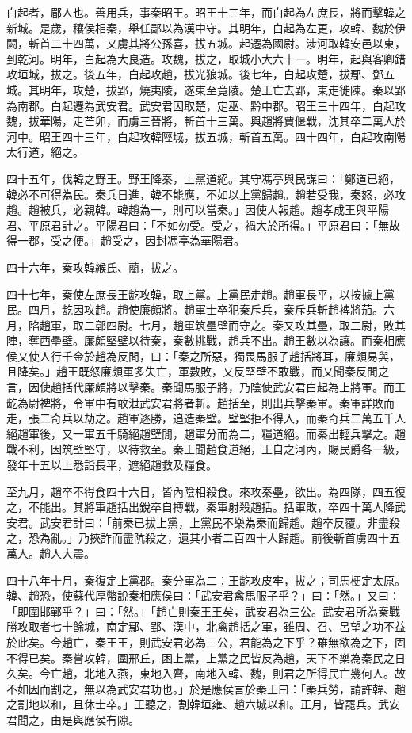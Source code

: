 
\begin{pinyinscope}
白起者，郿人也。善用兵，事秦昭王。昭王十三年，而白起為左庶長，將而擊韓之新城。是歲，穰侯相秦，舉任鄙以為漢中守。其明年，白起為左更，攻韓、魏於伊闕，斬首二十四萬，又虜其將公孫喜，拔五城。起遷為國尉。涉河取韓安邑以東，到乾河。明年，白起為大良造。攻魏，拔之，取城小大六十一。明年，起與客卿錯攻垣城，拔之。後五年，白起攻趙，拔光狼城。後七年，白起攻楚，拔鄢、鄧五城。其明年，攻楚，拔郢，燒夷陵，遂東至竟陵。楚王亡去郢，東走徙陳。秦以郢為南郡。白起遷為武安君。武安君因取楚，定巫、黔中郡。昭王三十四年，白起攻魏，拔華陽，走芒卯，而虜三晉將，斬首十三萬。與趙將賈偃戰，沈其卒二萬人於河中。昭王四十三年，白起攻韓陘城，拔五城，斬首五萬。四十四年，白起攻南陽太行道，絕之。

四十五年，伐韓之野王。野王降秦，上黨道絕。其守馮亭與民謀曰：「鄭道已絕，韓必不可得為民。秦兵日進，韓不能應，不如以上黨歸趙。趙若受我，秦怒，必攻趙。趙被兵，必親韓。韓趙為一，則可以當秦。」因使人報趙。趙孝成王與平陽君、平原君計之。平陽君曰：「不如勿受。受之，禍大於所得。」平原君曰：「無故得一郡，受之便。」趙受之，因封馮亭為華陽君。

四十六年，秦攻韓緱氏、藺，拔之。

四十七年，秦使左庶長王龁攻韓，取上黨。上黨民走趙。趙軍長平，以按據上黨民。四月，龁因攻趙。趙使廉頗將。趙軍士卒犯秦斥兵，秦斥兵斬趙裨將茄。六月，陷趙軍，取二鄣四尉。七月，趙軍筑壘壁而守之。秦又攻其壘，取二尉，敗其陣，奪西壘壁。廉頗堅壁以待秦，秦數挑戰，趙兵不出。趙王數以為讓。而秦相應侯又使人行千金於趙為反閒，曰：「秦之所惡，獨畏馬服子趙括將耳，廉頗易與，且降矣。」趙王既怒廉頗軍多失亡，軍數敗，又反堅壁不敢戰，而又聞秦反閒之言，因使趙括代廉頗將以擊秦。秦聞馬服子將，乃陰使武安君白起為上將軍。而王龁為尉裨將，令軍中有敢泄武安君將者斬。趙括至，則出兵擊秦軍。秦軍詳敗而走，張二奇兵以劫之。趙軍逐勝，追造秦壁。壁堅拒不得入，而秦奇兵二萬五千人絕趙軍後，又一軍五千騎絕趙壁閒，趙軍分而為二，糧道絕。而秦出輕兵擊之。趙戰不利，因筑壁堅守，以待救至。秦王聞趙食道絕，王自之河內，賜民爵各一級，發年十五以上悉詣長平，遮絕趙救及糧食。

至九月，趙卒不得食四十六日，皆內陰相殺食。來攻秦壘，欲出。為四隊，四五復之，不能出。其將軍趙括出銳卒自搏戰，秦軍射殺趙括。括軍敗，卒四十萬人降武安君。武安君計曰：「前秦已拔上黨，上黨民不樂為秦而歸趙。趙卒反覆。非盡殺之，恐為亂。」乃挾詐而盡阬殺之，遺其小者二百四十人歸趙。前後斬首虜四十五萬人。趙人大震。

四十八年十月，秦復定上黨郡。秦分軍為二：王龁攻皮牢，拔之；司馬梗定太原。韓、趙恐，使蘇代厚幣說秦相應侯曰：「武安君禽馬服子乎？」曰：「然。」又曰：「即圍邯鄲乎？」曰：「然。」「趙亡則秦王王矣，武安君為三公。武安君所為秦戰勝攻取者七十餘城，南定鄢、郢、漢中，北禽趙括之軍，雖周、召、呂望之功不益於此矣。今趙亡，秦王王，則武安君必為三公，君能為之下乎？雖無欲為之下，固不得已矣。秦嘗攻韓，圍邢丘，困上黨，上黨之民皆反為趙，天下不樂為秦民之日久矣。今亡趙，北地入燕，東地入齊，南地入韓、魏，則君之所得民亡幾何人。故不如因而割之，無以為武安君功也。」於是應侯言於秦王曰：「秦兵勞，請許韓、趙之割地以和，且休士卒。」王聽之，割韓垣雍、趙六城以和。正月，皆罷兵。武安君聞之，由是與應侯有隙。


\end{pinyinscope}
